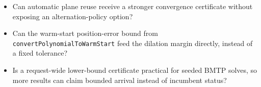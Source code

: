 \documentclass[11pt]{article}
\begin{document}
\begin{itemize}
    \item Can automatic plane reuse receive a stronger convergence certificate
    without exposing an alternation-policy option?
    \item Can the warm-start position-error bound from \texttt{convertPolynomialToWarmStart}
    feed the dilation margin directly, instead of a fixed tolerance?
    \item Is a request-wide lower-bound certificate practical for seeded BMTP solves,
    so more results can claim bounded arrival instead of incumbent status?
\end{itemize}
\end{document}
